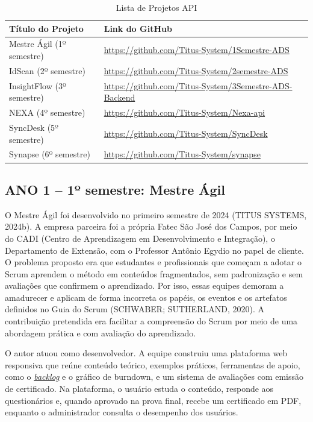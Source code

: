 \documentclass[12pt,a4paper]{article}
\newcommand{\termo}[2]{\hyperlink{gls:#1}{\textit{#2}}}
\newcommand{\fonte}[1]{\par\vspace{2pt}{\noindent\hspace{0.6cm}Fonte: #1\par}}
\newcommand{\ano}{2026}
\begin{document}
\begin{table}[H]
\centering
\caption{Lista de Projetos API}
\label{tab:projetos}
\renewcommand{\arraystretch}{1.1}
\begin{tabular}{p{6.4cm} p{8.6cm}}
\toprule
\textbf{Título do Projeto} & \textbf{Link do GitHub} \\
\midrule
Mestre Ágil (1º semestre) & \url{https://github.com/Titus-System/1Semestre-ADS} \\
IdScan (2º semestre) & \url{https://github.com/Titus-System/2semestre-ADS} \\
InsightFlow (3º semestre) & \url{https://github.com/Titus-System/3Semestre-ADS-Backend} \\
NEXA (4º semestre) & \url{https://github.com/Titus-System/Nexa-api} \\
SyncDesk (5º semestre) & \url{https://github.com/Titus-System/SyncDesk} \\
Synapse (6º semestre) & \url{https://github.com/Titus-System/synapse} \\
\bottomrule
\end{tabular}
\fonte{Elaborado por GARCIA, (\ano).}
\end{table}

\subsection{ANO 1 – 1º semestre: Mestre Ágil}

O Mestre Ágil foi desenvolvido no primeiro semestre de 2024 (TITUS SYSTEMS, 2024b). A empresa parceira foi a própria Fatec São José dos Campos, por meio do CADI (Centro de Aprendizagem em Desenvolvimento e Integração), o Departamento de Extensão, com o Professor Antônio Egydio no papel de cliente. O problema proposto era que estudantes e profissionais que começam a adotar o Scrum aprendem o método em conteúdos fragmentados, sem padronização e sem avaliações que confirmem o aprendizado. Por isso, essas equipes demoram a amadurecer e aplicam de forma incorreta os papéis, os eventos e os artefatos definidos no Guia do Scrum (SCHWABER; SUTHERLAND, 2020). A contribuição pretendida era facilitar a compreensão do Scrum por meio de uma abordagem prática e com avaliação do aprendizado.

O autor atuou como desenvolvedor. A equipe construiu uma plataforma web responsiva que reúne conteúdo teórico, exemplos práticos, ferramentas de apoio, como o \termo{backlog}{backlog} e o gráfico de burndown, e um sistema de avaliações com emissão de certificado. Na plataforma, o usuário estuda o conteúdo, responde aos questionários e, quando aprovado na prova final, recebe um certificado em PDF, enquanto o administrador consulta o desempenho dos usuários.
\end{document}

